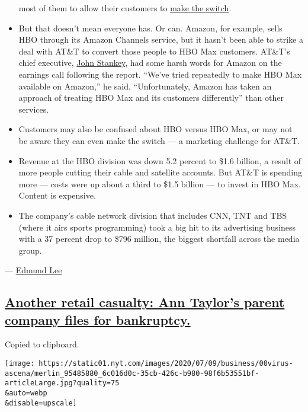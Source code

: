 \begin{itemize}
  most of them to allow their customers to
  \href{https://www.nytimes.com/article/hbo-max-amazon-roku.html}{make
  the switch}.
\item
  But that doesn't mean everyone has. Or can. Amazon, for example, sells
  HBO through its Amazon Channels service, but it hasn't been able to
  strike a deal with AT\&T to convert those people to HBO Max customers.
  AT\&T's chief executive,
  \href{https://www.nytimes.com/2020/04/24/business/media/att-ceo-john-stankey-randall-stephenson.html}{John
  Stankey}, had some harsh words for Amazon on the earnings call
  following the report. ``We've tried repeatedly to make HBO Max
  available on Amazon,'' he said, ``Unfortunately, Amazon has taken an
  approach of treating HBO Max and its customers differently'' than
  other services.
\item
  Customers may also be confused about HBO versus HBO Max, or may not be
  aware they can even make the switch --- a marketing challenge for
  AT\&T.
\item
  Revenue at the HBO division was down 5.2 percent to \$1.6 billion, a
  result of more people cutting their cable and satellite accounts. But
  AT\&T is spending more --- costs were up about a third to \$1.5
  billion --- to invest in HBO Max. Content is expensive.
\item
  The company's cable network division that includes CNN, TNT and TBS
  (where it airs sports programming) took a big hit to its advertising
  business with a 37 percent drop to \$796 million, the biggest
  shortfall across the media group.
\end{itemize}

--- \href{https://www.nytimes.com/by/edmund-lee}{Edmund Lee}

\hypertarget{another-retail-casualty-ann-taylors-parent-company-files-for-bankruptcy}{%
\subsection{\texorpdfstring{\protect\hyperlink{another-retail-casualty-ann-taylors-parent-company-files-for-bankruptcy}{Another
retail casualty: Ann Taylor's parent company files for
bankruptcy.}}{Another retail casualty: Ann Taylor's parent company files for bankruptcy.}}\label{another-retail-casualty-ann-taylors-parent-company-files-for-bankruptcy}}

Copied to clipboard.

\texttt{[image: https://static01.nyt.com/images/2020/07/09/business/00virus-ascena/merlin\_95485880\_6c016d0c-35cb-426c-b980-98f6b53551bf-articleLarge.jpg?quality=75\\\&auto=webp\\\&disable=upscale]}

